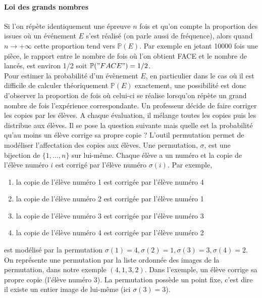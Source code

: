\documentclass{article}
\theoremstyle{remark}
\begin{document}
\paragraph{Loi des grands nombres}
Si l'on répète identiquement une épreuve $n$ fois et qu'on
compte la proportion des issues où un événement $E$ s'est réalisé (on parle aussi
de fréquence), alors quand $n → +∞$ cette proportion tend vers $\mathbb{P}(E)$.
Par exemple en jetant 10000 fois une pièce, le rapport entre le nombre de fois où l'on obtient FACE et le nombre de lancés, est environ 1/2 soit $\mathbb{P}("FACE") = 1/2$.\\
Pour estimer la probabilité d'un évènement $E$, en particulier dans le cas où il est difficile de calculer théoriquement  $\mathbb{P}(E)$ exactement, une possibilité est donc d'observer la
proportion de fois où celui-ci se réalise lorsqu'on répète un grand nombre de fois
l'expérience correspondante.
Un professeur décide de faire corriger les copies par les élèves. A chaque évaluation, il mélange toutes les copies puis les distribue aux élèves. Il se pose la question suivante mais quelle est la probabilité qu'au moins un élève corrige sa propre copie ? 
L'outil permutation permet de modéliser l'affectation des copies aux élèves. Une permutation, $\sigma$, est une bijection de $\{1,\dots,n\}$ sur lui-même.  Chaque élève a un numéro et  la copie de l'élève numéro $i$ est corrigé par l'élève numéro $\sigma(i)$.  Par exemple, 
\begin{enumerate}
\item la copie de l'élève numéro 1 est corrigée par l'élève numéro 4
\item la copie de l'élève numéro 2 est corrigée par l'élève numéro 1
\item la copie de l'élève numéro 3 est corrigée par l'élève numéro 3
\item la copie de l'élève numéro 4 est corrigée par l'élève numéro 2
\end{enumerate}
est modélisé par la permutation  $\sigma(1)=4,\sigma(2)=1,\sigma(3)=3, \sigma(4)=2$. On représente une permutation par la liste ordonnée des images de la permutation, dans notre exemple $(4,1,3,2)$. Dans l'exemple, un élève corrige sa propre copie (l'élève numéro 3).  La permutation possède un point fixe, c'est dire il existe un  entier image de lui-même (ici $\sigma(3)=3$).  
\end{document}
